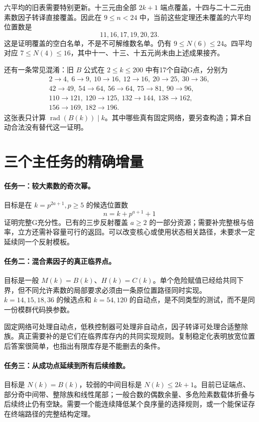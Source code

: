 \documentclass[11pt,a4paper,oneside,openany]{book}
\newcommand{\rad}{\operatorname{rad}}\newcommand{\diag}{\operatorname{diag}}
\theoremstyle{definition}\newtheorem{example}[theorem]{例}\newtheorem{conjecture}[theorem]{猜想}
\numberwithin{equation}{chapter}\setcounter{tocdepth}{1}
\begin{document}
六平均的旧表需要特别更新。十三元由全部 $2k+1$ 端点覆盖，十四与二十二元由素数因子转译直接覆盖。因此在 $9\le n<24$ 中，当前这些定理还未覆盖的六平均位置数是
\[11,16,17,19,20,23.
\]
这是证明覆盖的空白名单，不是不可解维数名单。仍有 $9\le N(6)\le24$。四平均对应 $7\le N(4)\le16$，其中十一、十三、十五元尚未由上述成果接齐。

还有一条常见混淆：旧 $B$ 公式在 $2\le k\le200$ 中有17个自动G点，分别为
\[
\begin{gathered}
2\to4,\ 6\to9,\ 10\to16,\ 12\to16,\ 20\to25,\ 30\to36,\\
42\to49,\ 54\to64,\ 56\to64,\ 75\to81,\ 90\to96,\\
110\to121,\ 120\to125,\ 132\to144,\ 138\to162,\\
156\to169,\ 182\to196.
\end{gathered}
\]
这张表只计算 $\rad(B(k))\mid k$。其中哪些真有固定网络，要另查构造；算术自动合法没有替代这一证明。

\section{三个主任务的精确增量}
\paragraph{任务一：较大素数的奇次幂。}
目标是在 $k=p^{2a+1},p\ge5$ 的候选位置数
\[n=k+p^{a+1}+1
\]
证明完整G充分性。已有的三步反射覆盖 $a\ge2$ 的一部分资源；需要补完整根与倍率，立方还需补容量可行的返回。可以改变核心或使用状态相关路径，未要求一定延续同一个反射模板。

\paragraph{任务二：混合素因子的真正临界点。}
目标是一般 $M(k)=B(k)$、$H(k)=C(k)$。单个危险赋值已经给共同下界，但不同允许素数的局部要求必须由一条原位置路径同时实现。$k=14,15,18,36$ 的候选点和 $k=54,120$ 的自动点，是不同类型的测试，而不是同一份模群代码换参数。

固定网络可处理自动点，低秩控制器可处理非自动点，因子转译可处理合适整除族。真正需要补的是它们在临界库存内的共同实现规则。复制稳定化表明放宽位置后答案很简单，也指出有限库存是不能删去的条件。

\paragraph{任务三：从成功点延续到所有后续维数。}
目标是 $N(k)=B(k)$，较弱的中间目标是 $N(k)\le2k+1$。目前已证端点、部分奇中间带、整除族和线性尾部；一般合数的偶数余量、多危险素数载体折叠与后续终止仍有空缺。需要一个能连续降低某个良序量的选择规则，或一个能保证存在终端路径的完整结构定理。
\end{document}
